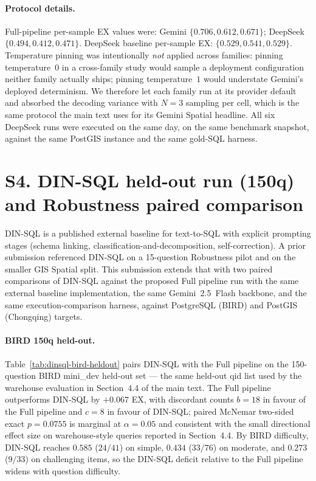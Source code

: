 \documentclass[11pt]{article}
\begin{document}
\paragraph{Protocol details.} Full-pipeline per-sample EX values were:
Gemini $\{0.706, 0.612, 0.671\}$; DeepSeek $\{0.494, 0.412, 0.471\}$.
DeepSeek baseline per-sample EX: $\{0.529, 0.541, 0.529\}$. Temperature
pinning was intentionally \emph{not} applied across families: pinning
temperature~$0$ in a cross-family study would sample a deployment
configuration neither family actually ships; pinning temperature~$1$ would
understate Gemini's deployed determinism. We therefore let each family run
at its provider default and absorbed the decoding variance with $N=3$
sampling per cell, which is the same protocol the main text uses for its
Gemini Spatial headline. All six DeepSeek runs were executed on the same day,
on the same benchmark snapshot, against the same PostGIS instance and the
same gold-SQL harness.

\section*{S4. DIN-SQL held-out run (150q) and Robustness paired comparison}

DIN-SQL is a published external baseline for text-to-SQL with explicit prompting
stages (schema linking, classification-and-decomposition, self-correction). A prior
submission referenced DIN-SQL on a 15-question Robustness pilot and on the smaller
GIS Spatial split. This submission extends that with two paired comparisons of DIN-SQL against
the proposed Full pipeline run with the same external baseline implementation, the
same Gemini~2.5~Flash backbone, and the same execution-comparison harness, against
PostgreSQL (BIRD) and PostGIS (Chongqing) targets.

\paragraph{BIRD 150q held-out.} Table~\ref{tab:dinsql-bird-heldout} pairs DIN-SQL
with the Full pipeline on the 150-question BIRD mini\_dev held-out set --- the same
held-out qid list used by the warehouse evaluation in Section~4.4 of the main text.
The Full pipeline outperforms DIN-SQL by $+0.067$ EX, with discordant counts
$b=18$ in favour of the Full pipeline and $c=8$ in favour of DIN-SQL; paired
McNemar two-sided exact $p=0.0755$ is marginal at $\alpha=0.05$ and consistent
with the small directional effect size on warehouse-style queries reported in
Section~4.4. By BIRD difficulty, DIN-SQL reaches $0.585$ ($24/41$) on simple,
$0.434$ ($33/76$) on moderate, and $0.273$ ($9/33$) on challenging items, so the
DIN-SQL deficit relative to the Full pipeline widens with question difficulty.
\end{document}
